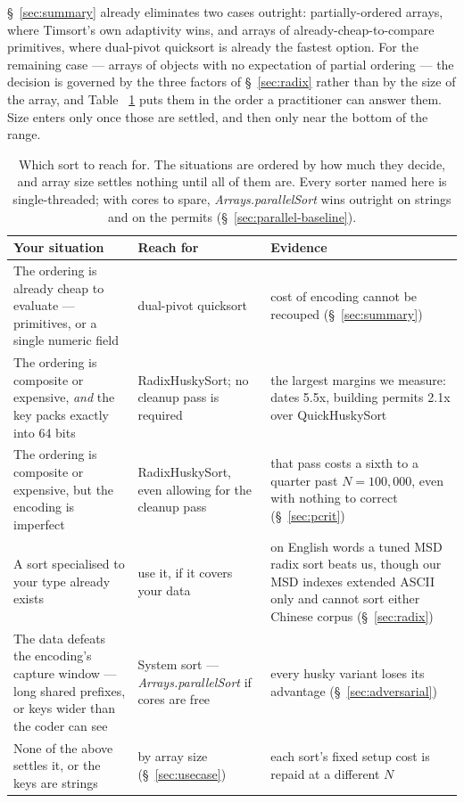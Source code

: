 \documentclass[twoside,leqno,twocolumn]{article}
\begin{document}
\S~\ref{sec:summary} already eliminates two cases outright:
partially-ordered arrays, where Timsort's own adaptivity wins, and arrays of already-cheap-to-compare primitives,
where dual-pivot quicksort is already the fastest option.
For the remaining case — arrays of objects with no expectation of partial ordering —
the decision is governed by the three factors of \S~\ref{sec:radix}
rather than by the size of the array,
and Table ~\ref{tab:Guidance} puts them in the order a practitioner can answer them.
Size enters only once those are settled, and then only near the bottom of the range.

\begin{table}
  \caption{Which sort to reach for. The situations are ordered by how much they decide, and
    array size settles nothing until all of them are. Every sorter named here is single-threaded; with
    cores to spare, \mbox{\textit{Arrays.parallelSort}} wins outright on strings and on the permits
    (\S~\ref{sec:parallel-baseline}).}
  \label{tab:Guidance}
  \centering
  \begin{tabular}{p{}p{}p{}}
    \toprule
Your situation & Reach for & Evidence \\
    \midrule
    The ordering is already cheap to evaluate --- primitives, or a single numeric field
      & dual-pivot quicksort & cost of encoding cannot be recouped (\S~\ref{sec:summary}) \\
    The ordering is composite or expensive, \emph{and} the key packs exactly into 64 bits
      & RadixHuskySort; no cleanup pass is required
      & the largest margins we measure: dates 5.5x, building permits 2.1x over QuickHuskySort \\
    The ordering is composite or expensive, but the encoding is imperfect
      & RadixHuskySort, even allowing for the cleanup pass
      & that pass costs a sixth to a quarter past $N=100{,}000$, even with nothing to correct
        (\S~\ref{sec:pcrit}) \\
    A sort specialised to your type already exists
      & use it, if it covers your data
      & on English words a tuned MSD radix sort beats us, though our MSD indexes extended
        ASCII only and cannot sort either Chinese corpus (\S~\ref{sec:radix}) \\
    The data defeats the encoding's capture window --- long shared prefixes, or keys wider than
    the coder can see
      & System sort --- \mbox{\textit{Arrays.parallelSort}} if cores are free
      & every husky variant loses its advantage (\S~\ref{sec:adversarial}) \\
    None of the above settles it, or the keys are strings
      & by array size (\S~\ref{sec:usecase})
      & each sort's fixed setup cost is repaid at a different $N$ \\
    \bottomrule
  \end{tabular}
\end{table}
\end{document}
